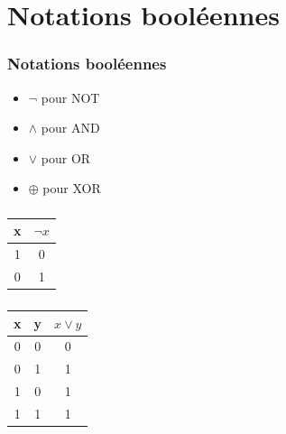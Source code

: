 \documentclass[svgnames,11pt]{beamer}
\begin{document}
\section{Notations booléennes}
\begin{frame}
    \frametitle{Notations booléennes}

    \begin{itemize}
        \item $\lnot$ pour NOT
        \item $\land$ pour AND
        \item $\lor$ pour OR
        \item $\oplus$ pour XOR
    \end{itemize}

\end{frame}
\begin{frame}
    \frametitle{}

    \begin{center}
        \begin{tabular}{|c|c|}
            \hline
            x & $\lnot x$ \\
            \hline
            1 & 0         \\
            \hline
            0 & 1         \\
            \hline
        \end{tabular}
    \end{center}


\end{frame}
\begin{frame}
    \frametitle{}

    \begin{center}
        \begin{tabular}{|c|c|c|}
            \hline
            x & y & $x\lor y$ \\
            \hline
            0 & 0 & 0         \\
            \hline
            0 & 1 & 1         \\
            \hline
            1 & 0 & 1         \\
            \hline
            1 & 1 & 1         \\
            \hline
        \end{tabular}
    \end{center}

\end{frame}
\end{document}
